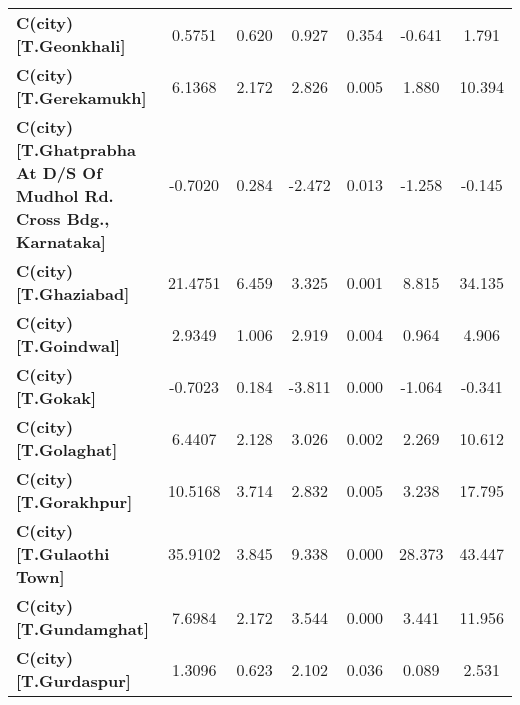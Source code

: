 \begin{center}
\begin{tabular}{lcccccc}
\textbf{C(city)[T.Geonkhali]}                                                                       &       0.5751  &        0.620     &     0.927  &         0.354        &       -0.641    &        1.791     \\
\textbf{C(city)[T.Gerekamukh]}                                                                      &       6.1368  &        2.172     &     2.826  &         0.005        &        1.880    &       10.394     \\
\textbf{C(city)[T.Ghatprabha At D/S Of Mudhol Rd. Cross Bdg., Karnataka]}                           &      -0.7020  &        0.284     &    -2.472  &         0.013        &       -1.258    &       -0.145     \\
\textbf{C(city)[T.Ghaziabad]}                                                                       &      21.4751  &        6.459     &     3.325  &         0.001        &        8.815    &       34.135     \\
\textbf{C(city)[T.Goindwal]}                                                                        &       2.9349  &        1.006     &     2.919  &         0.004        &        0.964    &        4.906     \\
\textbf{C(city)[T.Gokak]}                                                                           &      -0.7023  &        0.184     &    -3.811  &         0.000        &       -1.064    &       -0.341     \\
\textbf{C(city)[T.Golaghat]}                                                                        &       6.4407  &        2.128     &     3.026  &         0.002        &        2.269    &       10.612     \\
\textbf{C(city)[T.Gorakhpur]}                                                                       &      10.5168  &        3.714     &     2.832  &         0.005        &        3.238    &       17.795     \\
\textbf{C(city)[T.Gulaothi Town]}                                                                   &      35.9102  &        3.845     &     9.338  &         0.000        &       28.373    &       43.447     \\
\textbf{C(city)[T.Gundamghat]}                                                                      &       7.6984  &        2.172     &     3.544  &         0.000        &        3.441    &       11.956     \\
\textbf{C(city)[T.Gurdaspur]}                                                                       &       1.3096  &        0.623     &     2.102  &         0.036        &        0.089    &        2.531     \\

\end{tabular}
\end{center}
